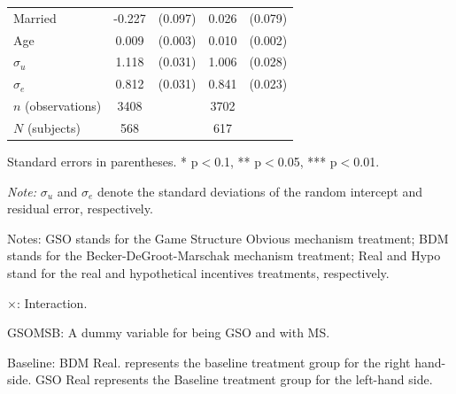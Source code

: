 \documentclass[12pt]{article}
\newcommand{\sym}[1]{\rlap{$^{#1}$}}
\begin{document}
\begin{table}[H]
{\begin{tabular}{l*{2}{cc}}
Married     &      -0.227\sym{**} &     (0.097)&       0.026         &     (0.079)\\
Age         &       0.009\sym{***}&     (0.003)&       0.010\sym{***}&     (0.002)\\
$\sigma_u$     &       1.118\sym{***}&     (0.031)&       1.006\sym{***}&     (0.028)\\
$\sigma_e $    &       0.812\sym{***}&     (0.031)&       0.841\sym{***}&     (0.023)\\
\hline
\(n\) (observations)       &        3408         &            &        3702         &            \\
\(N\) (subjects)       &        568         &            &        617         &            \\
\hline \hline
\end{tabular}
}


\begin{tablenotes}
            \footnotesize
            \item Standard errors in parentheses. * p$<$0.1, ** p$<$0.05, *** p$<$0.01.
            \item \textit{Note:} $\sigma_u$ and $\sigma_e$ denote the standard deviations of the random intercept and residual error, respectively.
            \item Notes: GSO stands for the Game Structure Obvious mechanism treatment; BDM stands for the Becker-DeGroot-Marschak mechanism treatment; Real and Hypo stand for the real and hypothetical incentives treatments, respectively.
           \item $\times$: Interaction.
           \item GSOMSB: A dummy variable for being GSO and with MS.
           \item Baseline: BDM Real. represents the baseline treatment group for the right hand-side. 
           GSO Real represents the Baseline treatment group for the left-hand side.
        \end{tablenotes}
\end{table}
\clearpage
\end{document}
